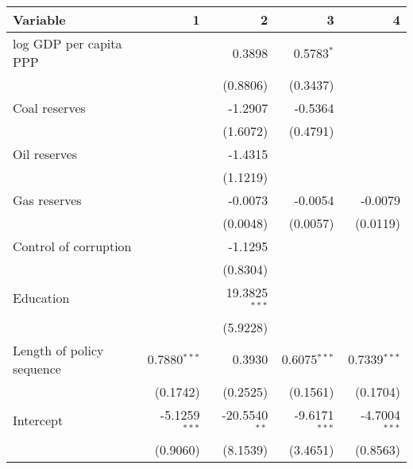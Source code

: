\begin{tabular}{lrrrr}
\toprule
                  Variable &                  1 &                  2 &                  3 &                  4 \\
\midrule
    log GDP per capita PPP &                    &             0.3898 &       0.5783$^{*}$ &                    \\
                           &                    &           (0.8806) &           (0.3437) &                    \\
             Coal reserves &                    &            -1.2907 &            -0.5364 &                    \\
                           &                    &           (1.6072) &           (0.4791) &                    \\
              Oil reserves &                    &            -1.4315 &                    &                    \\
                           &                    &           (1.1219) &                    &                    \\
              Gas reserves &                    &            -0.0073 &            -0.0054 &            -0.0079 \\
                           &                    &           (0.0048) &           (0.0057) &           (0.0119) \\
     Control of corruption &                    &            -1.1295 &                    &                    \\
                           &                    &           (0.8304) &                    &                    \\
                 Education &                    &  19.3825$^{* * *}$ &                    &                    \\
                           &                    &           (5.9228) &                    &                    \\
 Length of policy sequence &   0.7880$^{* * *}$ &             0.3930 &   0.6075$^{* * *}$ &   0.7339$^{* * *}$ \\
                           &           (0.1742) &           (0.2525) &           (0.1561) &           (0.1704) \\
                 Intercept &  -5.1259$^{* * *}$ &   -20.5540$^{* *}$ &  -9.6171$^{* * *}$ &  -4.7004$^{* * *}$ \\
                           &           (0.9060) &           (8.1539) &           (3.4651) &           (0.8563) \\

\end{tabular}
